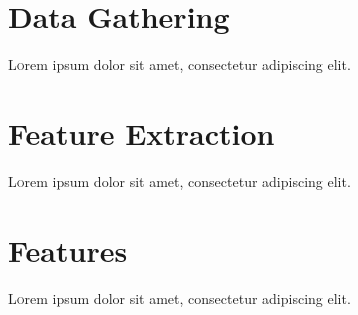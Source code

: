 \section{Data Gathering}

\lettrine[nindent=0em,lines=3]{L} orem ipsum dolor sit amet, consectetur adipiscing elit.
\lipsum[2-3] %

\section{Feature Extraction}

\lettrine[nindent=0em,lines=3]{L} orem ipsum dolor sit amet, consectetur adipiscing elit.
\lipsum[2-3] %

\section{Features}

\lettrine[nindent=0em,lines=3]{L} orem ipsum dolor sit amet, consectetur adipiscing elit.
\lipsum[2-3] %


